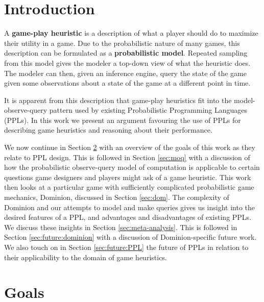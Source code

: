 
\section{Introduction} \label{sec:intro}
A {\bf game-play heuristic} is a description of what a player should do to maximize their
utility in a game. Due to the probabilistic nature of many games, this description
can be formulated as a {\bf probabilistic model}. Repeated sampling from this model
gives the modeler a top-down view of what the heuristic does.
The modeler can then, given an inference engine, query the state of the game given
some observations about a state of the game at a different point in time.

It is apparent from this description that game-play heuristics fit
into the model-observe-query pattern used by existing Probabilistic Programming
Languages (PPLs).
In this work we present an argument favouring the use of PPLs
for describing game heuristics and reasoning about their performance.

We now continue in Section \ref{sec:goals} with an overview of the goals of this
work as they relate to PPL design. This is followed in Section \ref{sec:moq}
with a discussion of how the probabilistic observe-query model of computation
is applicable to certain questions game designers and players might ask of a
game heuristic. This work then looks at a particular game with sufficiently
complicated probabilistic game mechanics, Dominion, discussed in Section
\ref{sec:dom}.
The complexity of Dominion and our attempts to model and make queries gives
us insight into the desired features of a PPL, and advantages and disadvantages
of existing PPLs. We discuss these insights in Section \ref{sec:meta-analysis}.
This is followed in Section \ref{sec:future:dominion} with a discussion of
Dominion-specific future work. We also touch on in Section \ref{sec:future:PPL}
the future of PPLs in relation to their applicability to the domain of
game heuristics.


\section{Goals} \label{sec:goals}


